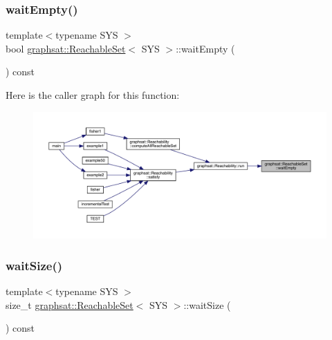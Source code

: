\subsubsection{\texorpdfstring{waitEmpty()}{waitEmpty()}}
{\footnotesize\ttfamily template$<$typename S\+YS $>$ \\
bool \mbox{\hyperlink{classgraphsat_1_1_reachable_set}{graphsat\+::\+Reachable\+Set}}$<$ S\+YS $>$\+::wait\+Empty (\begin{DoxyParamCaption}{ }\end{DoxyParamCaption}) const\hspace{0.3cm}{\ttfamily [inline]}}

Here is the caller graph for this function\+:
\nopagebreak
\begin{figure}[H]
\begin{center}
\leavevmode
\includegraphics[width=350pt]{classgraphsat_1_1_reachable_set_abf81935c4ff3047a775bc99070b1faed_icgraph}
\end{center}
\end{figure}
\mbox{\label{classgraphsat_1_1_reachable_set_a7825d544d345f8fa18ad1780abe92d5d}} 
\subsubsection{\texorpdfstring{waitSize()}{waitSize()}}
{\footnotesize\ttfamily template$<$typename S\+YS $>$ \\
size\+\_\+t \mbox{\hyperlink{classgraphsat_1_1_reachable_set}{graphsat\+::\+Reachable\+Set}}$<$ S\+YS $>$\+::wait\+Size (\begin{DoxyParamCaption}{ }\end{DoxyParamCaption}) const\hspace{0.3cm}{\ttfamily [inline]}}

